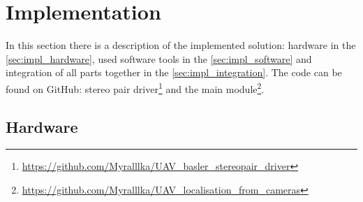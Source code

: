 \chapter{Implementation}
\label{chapter:implementation}

In this section there is a description of the implemented solution: hardware in the \autoref{sec:impl_hardware}, used software tools in the \autoref{sec:impl_software} and integration of all parts together in the \autoref{sec:impl_integration}. The code can be found on GitHub: stereo pair driver\footnote{\url{https://github.com/Myralllka/UAV_basler_stereopair_driver}} and the main module\footnote{\url{https://github.com/Myralllka/UAV_localisation_from_cameras}}.

\section{Hardware}
\label{sec:impl_hardware}
